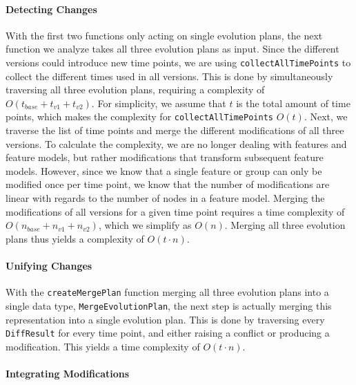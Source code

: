 \documentclass[a4paper,english]{ifimaster}
\begin{document}
\paragraph{Detecting Changes}

With the first two functions only acting on single evolution plans, the next function we analyze takes all three evolution plans as input. Since the different versions could introduce new time points, we are using \texttt{collectAllTimePoints} to collect the different times used in all versions. This is done by simultaneously traversing all three evolution plans, requiring a complexity of $O(t_{base} + t_{v1} + t_{v2})$. For simplicity, we assume that $t$ is the total amount of time points, which makes the complexity for \texttt{collectAllTimePoints} $O(t)$. Next, we traverse the list of time points and merge the different modifications of all three versions. To calculate the complexity, we are no longer dealing with features and feature models, but rather modifications that transform subsequent feature models. However, since we know that a single feature or group can only be modified once per time point, we know that the number of modifications are linear with regards to the number of nodes in a feature model. Merging the modifications of all versions for a given time point requires a time complexity of $O(n_{base} + n_{v1} + n_{v2})$, which we simplify as $O(n)$. Merging all three evolution plans thus yields a complexity of $O(t \cdot n)$.

\paragraph{Unifying Changes}

With the \texttt{createMergePlan} function merging all three evolution plans into a single data type, \texttt{MergeEvolutionPlan}, the next step is actually merging this representation into a single evolution plan. This is done by traversing every \texttt{DiffResult} for every time point, and either raising a conflict or producing a modification. This yields a time complexity of $O(t \cdot n)$.

\paragraph{Integrating Modifications}
\end{document}
